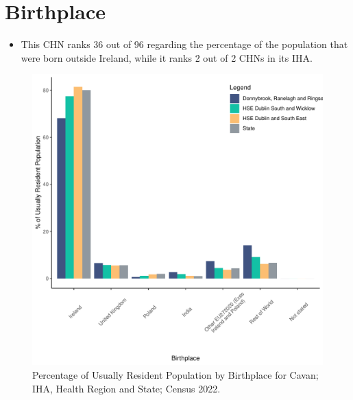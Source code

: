 \documentclass{article}
\begin{document}
\section{Birthplace}\label{sect:Birth}
\begin{itemize}
\item This CHN ranks  36 out of 96 regarding the percentage of the population that were born outside Ireland, while it ranks  2 out of 2 CHNs in its IHA.
\end{itemize}
\begin{figure}[H]
	\centering
	\includegraphics[width = 130mm]{../figures/BirthED.pdf}
	\caption{Percentage of Usually Resident Population by Birthplace for Cavan; IHA, Health Region and State; Census 2022.}
	\label{fig:vbnv}
	\end{figure}
	
\end{document}
